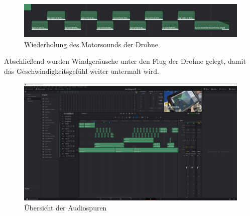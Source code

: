 \begin{figure}[H]
\begin{center}
\includegraphics[width=\textwidth]{gfx/post/sample.jpg}
\caption{Wiederholung des Motorsounds der Drohne}
\label{sample}
\end{center}
\end{figure}

Abschließend wurden Windgeräusche unter den Flug der Drohne gelegt, damit das Geschwindigkeitsgefühl weiter untermalt wird. 

\begin{figure}[H]
\begin{center}
\includegraphics[width=\textwidth]{gfx/post/resolve1.jpg}
\caption{Übersicht der Audiospuren}
\label{resolve1}
\end{center}
\end{figure}
